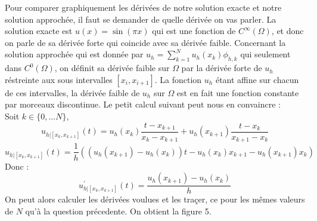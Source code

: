 \documentclass[a4paper,12pt]{article}
\begin{document}
Pour comparer graphiquement les d\'eriv\'ees de notre solution exacte et notre solution approch\'ee, il faut se demander de quelle d\'eriv\'ee on vas parler. La solution exacte est $u(x)=\sin(\pi x)$ qui est une fonction de $C^{\infty}(\Omega)$, et donc on parle de sa d\'eriv\'ee forte qui coincide avec sa d\'eriv\'ee faible. Concernant la solution approch\'ee qui est donn\'ee par $u_{h}=\sum_{k=1}^{N} u_{h}(x_{k})\phi_{h,k}$ qui seulement dans $C^{0}(\Omega)$, on d\'efinit sa d\'eriv\'ee faible sur $\Omega$ par la d\'eriv\'ee forte de $u_{h}$ r\'estreinte aux sous intervalles $[x_{i},x_{i+1}]$. La fonction $u_h$ \'etant affine sur chacun de ces intervalles, la d\'eriv\'ee faible de $u_h$ sur $\Omega$ est en fait une fonction constante par morceaux discontinue. Le petit calcul suivant peut nous en convaincre :\\
Soit $k \in \{0,...N\}$,
\[u_{h|[x_{k},x_{k+1}]}(t)=u_{h}(x_{k})\frac{t-x_{k+1}}{x_{k}-x_{k+1}}+u_{h}(x_{k+1})\frac{t-x_{k}}{x_{k+1}-x_{k}}\]
\[u_{h|[x_{k},x_{k+1}]}(t)=\frac{1}{h}((u_{h}(x_{k+1})-u_{h}(x_{k}))t-u_{h}(x_{k})x_{k+1}-u_{h}(x_{k+1})x_{k})\]
Donc :
\begin{equation}
u_{h|[x_{k},x_{k+1}]}^{'}(t)=\frac{u_{h}(x_{k+1})-u_{h}(x_{k})}{h}
\label{eq_9}
\end{equation}
On peut alors calculer les d\'eriv\'ees voulues et les tra\c{c}er, ce  pour les m\^emes valeurs de $N$ qu'\`a la question pr\'ecedente. On obtient la figure 5.
\end{document}
